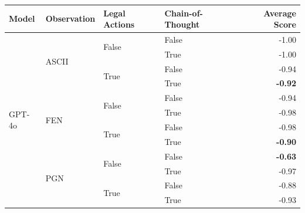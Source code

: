 \begin{tabular}{@{}llllr@{}}
    \toprule
    \textbf{Model}                  & \textbf{Observation}      & \textbf{Legal Actions}    & \textbf{Chain-of-Thought} & \textbf{Average Score} \\
    \midrule    
    \multirow[c]{17}{*}{GPT-4o}     & \multirow[c]{4}{*}{ASCII} & \multirow[c]{2}{*}{False} & False                     & -1.00 \\
                                    &                           &                           & True                      & -1.00 \\
                                    &                           & \multirow[c]{2}{*}{True}  & False                     & -0.94 \\
                                    &                           &                           & True                      & \textbf{-0.92} \\
    \cmidrule{2-5}                                                                                                         
                                    & \multirow[c]{4}{*}{FEN}   & \multirow[c]{2}{*}{False} & False                     & -0.94 \\
                                    &                           &                           & True                      & -0.98 \\
                                    &                           & \multirow[c]{2}{*}{True}  & False                     & -0.98 \\
                                    &                           &                           & True                      & \textbf{-0.90} \\
    \cmidrule{2-5}                                                                                                         
                                    & \multirow[c]{4}{*}{PGN}   & \multirow[c]{2}{*}{False} & False                     & \textbf{-0.63} \\
                                    &                           &                           & True                      & -0.97 \\
                                    &                           & \multirow[c]{2}{*}{True}  & False                     & -0.88 \\
                                    &                           &                           & True                      & -0.93 \\

\end{tabular}

